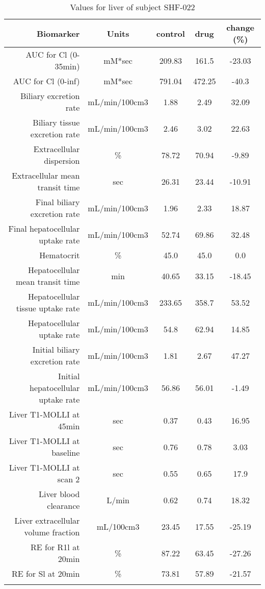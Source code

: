 \documentclass{epflreport}%
\begin{document}
%
\clearpage%
\begin{longtable}{rcccc}%
\hline%
Biomarker&Units&control&drug&change (\%)\\%
\hline%
AUC for Cl (0{-}35min)&mM*sec&209.83&161.5&{-}23.03\\%
AUC for Cl (0{-}inf)&mM*sec&791.04&472.25&{-}40.3\\%
Biliary excretion rate&mL/min/100cm3&1.88&2.49&32.09\\%
Biliary tissue excretion rate&mL/min/100cm3&2.46&3.02&22.63\\%
Extracellular dispersion&\%&78.72&70.94&{-}9.89\\%
Extracellular mean transit time&sec&26.31&23.44&{-}10.91\\%
Final biliary excretion rate&mL/min/100cm3&1.96&2.33&18.87\\%
Final hepatocellular uptake rate&mL/min/100cm3&52.74&69.86&32.48\\%
Hematocrit&\%&45.0&45.0&0.0\\%
Hepatocellular mean transit time&min&40.65&33.15&{-}18.45\\%
Hepatocellular tissue uptake rate&mL/min/100cm3&233.65&358.7&53.52\\%
Hepatocellular uptake rate&mL/min/100cm3&54.8&62.94&14.85\\%
Initial biliary excretion rate&mL/min/100cm3&1.81&2.67&47.27\\%
Initial hepatocellular uptake rate&mL/min/100cm3&56.86&56.01&{-}1.49\\%
Liver T1{-}MOLLI at 45min&sec&0.37&0.43&16.95\\%
Liver T1{-}MOLLI at baseline&sec&0.76&0.78&3.03\\%
Liver T1{-}MOLLI at scan 2&sec&0.55&0.65&17.9\\%
Liver blood clearance&L/min&0.62&0.74&18.32\\%
Liver extracellular volume fraction&mL/100cm3&23.45&17.55&{-}25.19\\%
RE for R1l at 20min&\%&87.22&63.45&{-}27.26\\%
RE for Sl at 20min&\%&73.81&57.89&{-}21.57\\%
\hline%
\caption{Values for liver of subject SHF-022} \\%
\end{longtable}%
\end{document}
